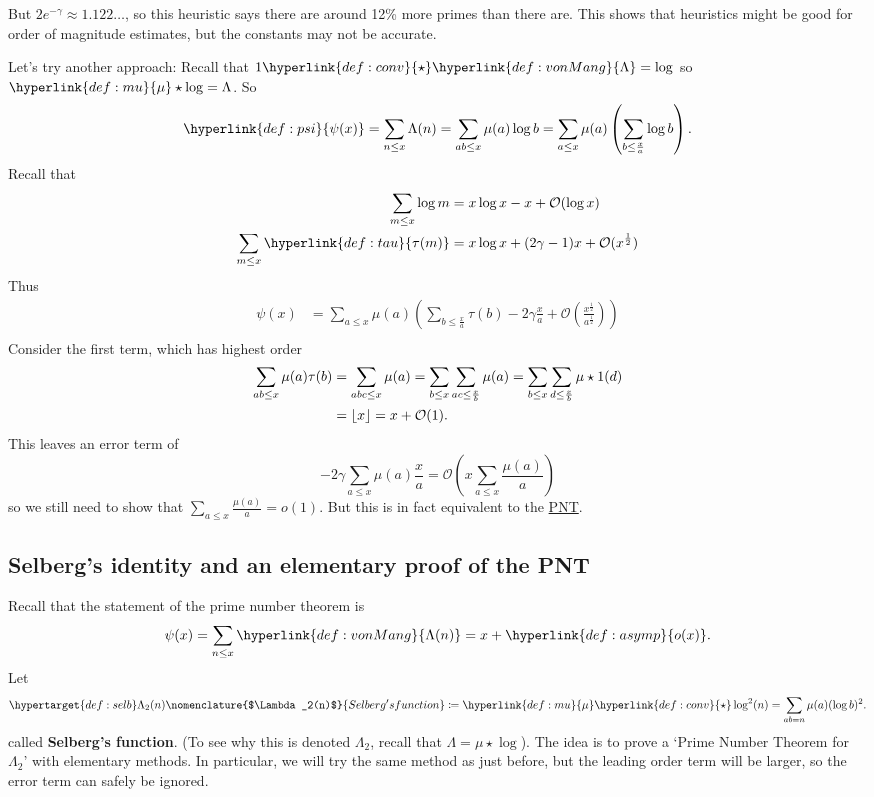 \documentclass{article}
\newcommand{\1}{\mathbbm{1}}
\newcommand{\named}[1]{\textbf{#1}\index{#1}}
\newcommand{\bigO}{\mathcal{O}}
\DeclarePairedDelimiter\floor{\lfloor}{\rfloor}
\begin{document}
But $2 e^{-\gamma} \approx 1.122\dots$, so this heuristic says there are around 12\% more primes than there are.
This shows that heuristics might be good for order of magnitude estimates, but the constants may not be accurate.

Let's try another approach:
Recall that $1 \hyperlink{def:conv}{\star} \hyperlink{def:vonMang}{\Lambda} = \log$ so $\hyperlink{def:mu}{\mu} \star \log = \Lambda$.
So
\begin{equation*}
  \hyperlink{def:psi}{\psi(x)} = \sum_{n \leq x} \Lambda(n) = \sum_{ab \leq x} \mu(a) \log b = \sum_{a \leq x} \mu(a) \left(\sum_{b \leq \frac{x}{a}} \log b\right).
\end{equation*}
Recall that
\begin{align*}
  \sum_{m \leq x} \log m &= x \log x - x + \bigO(\log x) \\
  \sum_{m \leq x} \hyperlink{def:tau}{\tau(m)} &= x \log x + (2 \gamma - 1) x + \bigO(x^{\frac{1}{2}})
\end{align*}
Thus
\begin{align*}
  \psi(x) &= \sum_{a \leq x} \mu(a) \left(\sum_{b \leq \frac{x}{a}} \tau(b) - 2 \gamma \frac{x}{a} + \bigO\left(\frac{x^{\frac{1}{2}}}{a^{\frac{1}{2}}}\right)\right) \\
\end{align*}
Consider the first term, which has highest order
\begin{align*}
 \sum_{ab \leq x} \mu(a) \tau(b) &= \sum_{abc \leq x} \mu(a) = \sum_{b \leq x} \sum_{ac \leq \frac{x}{b}} \mu(a) = \sum_{b \leq x} \sum_{d \leq \frac{x}{b}} \mu \star 1(d) \\
          &= \floor{x} = x + \bigO(1).
\end{align*}
This leaves an error term of
\begin{equation*}
  -2 \gamma \sum_{a \leq x} \mu(a) \frac{x}{a} = \bigO\left(x \sum_{a \leq x} \frac{\mu(a)}{a}\right)
\end{equation*}
so we still need to show that $\sum_{a \leq x} \frac{\mu(a)}{a} = o(1)$. But this is in fact equivalent to the \hyperlink{def:pnt}{PNT}.

\subsection{Selberg's identity and an elementary proof of the PNT}
\newlec
Recall that the statement of the prime number theorem is
\begin{equation*}
  \psi(x) = \sum_{n \leq x} \hyperlink{def:vonMang}{\Lambda(n)} = x + \hyperlink{def:asymp}{o(x)}.
\end{equation*}
Let
\begin{equation*}
  \hypertarget{def:selb}\Lambda_2(n)\nomenclature{$\Lambda_2(n)$}{Selberg's function} \coloneqq \hyperlink{def:mu}{\mu} \hyperlink{def:conv}{\star} \log^2 (n) = \sum_{ab=n} \mu(a) (\log b)^2.
\end{equation*}
called \named{Selberg's function}. (To see why this is denoted $\Lambda_2$, recall that $\Lambda = \mu \star \log$).
The idea is to prove a `Prime Number Theorem for $\Lambda_2$' with elementary methods.
In particular, we will try the same method as just before, but the leading order term will be larger, so the error term can safely be ignored.
\end{document}
